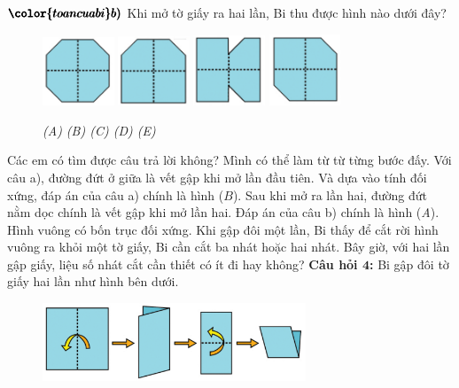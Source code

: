 $\pmb{\color{toancuabi}b)}$ Khi mở tờ giấy ra hai lần, Bi thu được hình nào dưới đây?
\begin{figure}[H]
	\centering
	\captionsetup{labelformat=empty}
	\vspace*{-5pt}
	\captionsetup{justification=centering}
	\includegraphics[width =0.19\textwidth]{cat-9a}
	\hfill
	\includegraphics[width =0.19\textwidth]{cat-9b}
	\hfill
	\includegraphics[width =0.19\textwidth]{cat-9c}
	\hfill
	\includegraphics[width =0.19\textwidth]{cat-9d}
	\caption{\small \it (A) \hfill (B) \hfill (C) \hfill (D) \hfill (E)}
\end{figure}
Các em có tìm được câu trả lời không? Mình có thể làm từ từ từng bước đấy. Với câu a), đường đứt ở giữa là vết gập khi mở lần đầu tiên. Và dựa vào tính đối xứng, đáp án của câu a) chính là hình ($B$).
\vskip 0.1cm
Sau khi mở ra lần hai, đường đứt nằm dọc chính là vết gập khi mở lần hai. Đáp án của câu b) chính là hình (\textit{A}).
\vskip 0.1cm
Hình vuông có bốn trục đối xứng. Khi gập đôi một lần, Bi thấy để cắt rời hình vuông ra khỏi một tờ giấy, Bi cần cắt ba nhát hoặc hai nhát. Bây giờ, với hai lần gập giấy, liệu số nhát cắt cần thiết có ít đi hay không?
\vskip 0.1cm
\textbf{\color{toancuabi}Câu hỏi $\pmb{4}$:} Bi gập đôi tờ giấy hai lần như hình bên dưới. 
\begin{figure}[H]
	\captionsetup{labelformat=empty}
	\vspace*{-5pt}
	\centering
	\captionsetup{justification=raggedleft}
	\includegraphics[width =0.7\textwidth]{cat-10}
	\vspace*{-10pt}
\end{figure}
